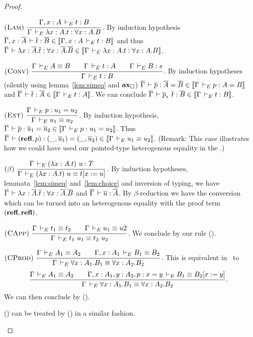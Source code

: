 \documentclass[11pt]{article}
\theoremstyle{plain}
\theoremstyle{remark}
\begin{document}
\begin{proof}
\begin{caselist}
    \nextcase \(
      \nmru{Lam%
          }{\Gamma, x:A \dere t : B
          }{\Gamma \dere \lambda x:A.t : \forall x:A.B}
    \).
    By induction hypothesis
    $\overline{\Gamma}, x:\overline{A} \,\vdash \overline{t} : \overline{B} \in
    \mathopen{{[\kern-0.14em[}} \Gamma, x:A \,\vdash_E t : B \mathclose{{]\kern-0.14em]}}$ and thus
    $\overline{\Gamma} \,\vdash \lambda x:\overline{A}.\overline{t} : \forall x:\overline{A}.\overline{B} \in
    \mathopen{{[\kern-0.14em[}} \Gamma \,\vdash_E \lambda x:A.t : \forall x:A.B \mathclose{{]\kern-0.14em]}}$.

    \nextcase \(
      \nmru{Conv%
          }{\Gamma \dere A \equiv B \qquad
            \Gamma \dere t : A \qquad
            \Gamma \dere B : s
          }{\Gamma \dere t : B}
    \).
    By induction hypotheses (silently using lemma~\ref{lem:simeq} and $\operatorname{\mathbf{ax}_\square}$)
    $\overline{\Gamma} \,\vdash \overline{p} : \overline{A} = \overline{B} \in \mathopen{{[\kern-0.14em[}} \Gamma \,\vdash_E p : A = B \mathclose{{]\kern-0.14em]}}$
    and $\overline{\Gamma} \,\vdash \overline{t} : \overline{A} \in \mathopen{{[\kern-0.14em[}} \Gamma \,\vdash_E t : A \mathclose{{]\kern-0.14em]}}$.
    We can conclude $\overline{\Gamma} \,\vdash \overline{p}_*\ \overline{t} : \overline{B} \in
    \mathopen{{[\kern-0.14em[}} \Gamma \,\vdash_E t : B \mathclose{{]\kern-0.14em]}}$.

    \nextcase \(
      \nmru{Ext%
          }{\Gamma \dere p : u_1 = u_2
          }{\Gamma \dere u_1 \equiv u_2}
    \).
    By induction hypothesis,
    $\overline{\Gamma} \,\vdash \overline{p} : \overline{u}_1 = \overline{u}_2 \in \mathopen{{[\kern-0.14em[}} \Gamma \,\vdash_E p : u_1 = u_2 \mathclose{{]\kern-0.14em]}}$.
    Thus $\overline{\Gamma} \,\vdash (\operatorname{\mathbf{refl}},p) : (\_,\overline{u}_1) = (\_,\overline{u}_2) \in
    \mathopen{{[\kern-0.14em[}} \Gamma \,\vdash_E u_1 \equiv u_2 \mathclose{{]\kern-0.14em]}}$.
    (Remark: This case illustrates how we could have used our pointed-type
    heterogenous equality in the \CCe.)

    \nextcase \(
      \nmru{$\beta$%
          }{\Gamma \dere (\lambda x:A. t)\ u : T
          }{\Gamma \dere (\lambda x:A. t)\ u \equiv t[x := u]}
    \).
    By induction hypotheses, lemmata~\ref{lem:simeq} and~\ref{lem:choice} and
    inversion of typing, we have
    $\overline{\Gamma} \,\vdash \lambda x:\overline{A}.\overline{t} : \forall x:\overline{A}.\overline{B}$ and
    $\overline{\Gamma} \,\vdash \overline{u} : \bar {\overline{A}}$.
    By $\beta$-reduction we have the conversion which can be turned into
    an heterogenous equality with the proof term $(\operatorname{\mathbf{refl}},\operatorname{\mathbf{refl}})$.

    \nextcase \(
      \nmru{CApp%
          }{\Gamma \dere t_1 \equiv t_2 \qquad
            \Gamma \dere u_1 \equiv u2
          }{\Gamma \dere t_1\ u_1 \equiv t_2\ u_2}
    \).
    We conclude by our rule ().

    \nextcase \(
      \nmru{CProd%
          }{\Gamma \dere A_1 \equiv A_2 \qquad
            \Gamma, x:A_1 \dere B_1 \equiv B_2
          }{\Gamma \dere \forall x:A_1.B_1 \equiv \forall x:A_2.B_2}
    \).
    This is equivalent in \CCe\ to
    \[
      \ru{\Gamma \dere A_1 \equiv A_2 \qquad
          \Gamma, x:A_1, y:A_2, p : x = y \dere B_1 \equiv B_2[x := y]
        }{\Gamma \dere \forall x:A_1.B_1 \equiv \forall x:A_2.B_2}.
    \]
    We can then conclude by ().

    \nextcase () can be treated by () in a similar
    fashion.
  \end{caselist}
\end{proof}
\end{document}
